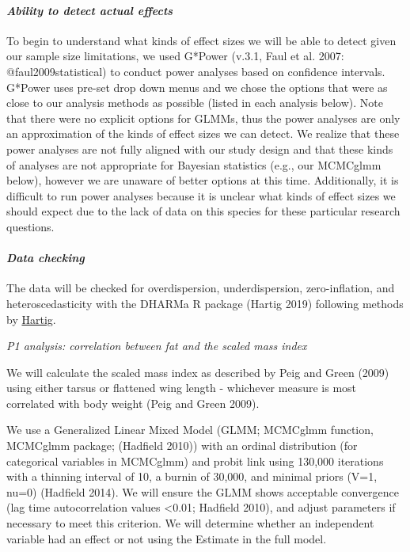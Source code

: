 \documentclass[
]{article}
\begin{document}
\hypertarget{ability-to-detect-actual-effects}{%
\paragraph{\texorpdfstring{\emph{Ability to detect actual
effects}}{Ability to detect actual effects}}\label{ability-to-detect-actual-effects}}

To begin to understand what kinds of effect sizes we will be able to
detect given our sample size limitations, we used G*Power (v.3.1, Faul
et al. 2007: @faul2009statistical) to conduct power analyses based on
confidence intervals. G*Power uses pre-set drop down menus and we chose
the options that were as close to our analysis methods as possible
(listed in each analysis below). Note that there were no explicit
options for GLMMs, thus the power analyses are only an approximation of
the kinds of effect sizes we can detect. We realize that these power
analyses are not fully aligned with our study design and that these
kinds of analyses are not appropriate for Bayesian statistics (e.g., our
MCMCglmm below), however we are unaware of better options at this time.
Additionally, it is difficult to run power analyses because it is
unclear what kinds of effect sizes we should expect due to the lack of
data on this species for these particular research questions.

\hypertarget{data-checking}{%
\paragraph{\texorpdfstring{\emph{Data
checking}}{Data checking}}\label{data-checking}}

The data will be checked for overdispersion, underdispersion,
zero-inflation, and heteroscedasticity with the DHARMa R package (Hartig
2019) following methods by
\href{https://cran.r-project.org/web/packages/DHARMa/vignettes/DHARMa.html}{Hartig}.

\emph{P1 analysis: correlation between fat and the scaled mass index}

We will calculate the scaled mass index as described by Peig and Green
(2009) using either tarsus or flattened wing length - whichever measure
is most correlated with body weight (Peig and Green 2009).

We use a Generalized Linear Mixed Model (GLMM; MCMCglmm function,
MCMCglmm package; (Hadfield 2010)) with an ordinal distribution (for
categorical variables in MCMCglmm) and probit link using 130,000
iterations with a thinning interval of 10, a burnin of 30,000, and
minimal priors (V=1, nu=0) (Hadfield 2014). We will ensure the GLMM
shows acceptable convergence (lag time autocorrelation values
\textless0.01; Hadfield 2010), and adjust parameters if necessary to
meet this criterion. We will determine whether an independent variable
had an effect or not using the Estimate in the full model.
\end{document}
